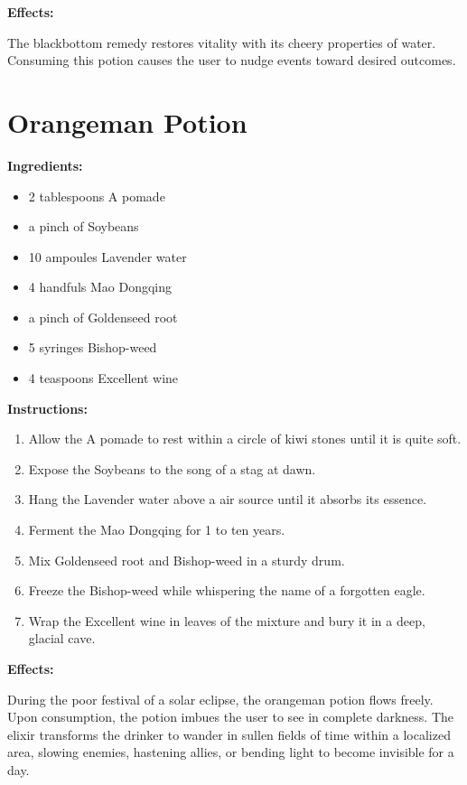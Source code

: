 \documentclass{article}
\begin{document}
\textbf{Effects:}

The blackbottom remedy restores vitality with its cheery properties of water. Consuming this potion causes the user to nudge events toward desired outcomes.

\newpage
\section*{Orangeman Potion}

\textbf{Ingredients:}

\begin{itemize}
  \item 2 tablespoons A pomade
  \item a pinch of Soybeans
  \item 10 ampoules Lavender water
  \item 4 handfuls Mao Dongqing
  \item a pinch of Goldenseed root
  \item 5 syringes Bishop-weed
  \item 4 teaspoons Excellent wine
\end{itemize}

\textbf{Instructions:}

\begin{enumerate}
  \item Allow the A pomade to rest within a circle of kiwi stones until it is quite soft.
  \item Expose the Soybeans to the song of a stag at dawn.
  \item Hang the Lavender water above a air source until it absorbs its essence.
  \item Ferment the Mao Dongqing for 1 to ten years.
  \item Mix Goldenseed root and Bishop-weed in a sturdy drum.
  \item Freeze the Bishop-weed while whispering the name of a forgotten eagle.
  \item Wrap the Excellent wine in leaves of the mixture and bury it in a deep, glacial cave.
\end{enumerate}

\textbf{Effects:}

During the poor festival of a solar eclipse, the orangeman potion flows freely. Upon consumption, the potion imbues the user to see in complete darkness. The elixir transforms the drinker to wander in sullen fields of time within a localized area, slowing enemies, hastening allies, or bending light to become invisible for a day.
\end{document}
